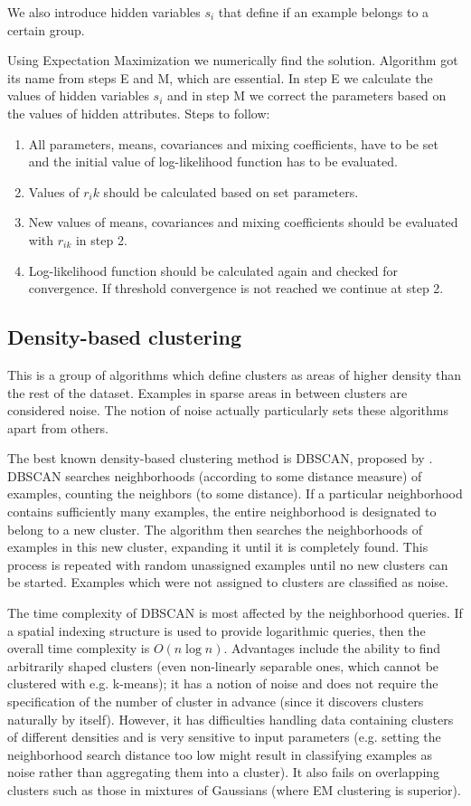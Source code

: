\documentclass[conference]{IEEEtran}
\begin{document}
We also introduce hidden variables $s_i$ that define if an example belongs to a certain group.

Using Expectation Maximization we numerically find the solution. Algorithm got its name from steps E and M,
which are essential. In step E we calculate the values of hidden variables $s_i$ and in step M we correct the parameters based
on the values of hidden attributes. Steps to follow:

\begin{enumerate}
	\item All parameters, means, covariances and mixing coefficients, have to be set and the initial value of log-likelihood
		function has to be evaluated.
	\item Values of $r_ik$ should be calculated based on set parameters.
	\item New values of means, covariances and mixing coefficients should be evaluated with $r_{ik}$ in step 2.
	\item Log-likelihood function should be calculated again and checked for convergence. If threshold convergence
		is not reached we continue at step 2.
\end{enumerate}


\subsection{Density-based clustering}
This is a group of algorithms which define clusters as areas of higher density than the rest
of the dataset. Examples in sparse areas in between clusters are considered noise. The notion
of noise actually particularly sets these algorithms apart from others.

The best known density-based clustering method is DBSCAN, proposed by \cite{ester96}.
DBSCAN searches neighborhoods (according to some distance measure) of examples,
counting the neighbors (to some distance). If a
particular neighborhood contains sufficiently many examples, the entire neighborhood is
designated to belong to a new cluster. The algorithm then searches the neighborhoods of examples
in this new cluster, expanding it until it is completely found.
This process is repeated with random unassigned examples until no new clusters can be started.
Examples which were not assigned to clusters are classified as noise.

The time complexity of DBSCAN is most affected by the neighborhood queries. If a spatial
indexing structure is used to provide logarithmic queries, then the overall time complexity
is $O(n\log n)$. Advantages include the ability to find arbitrarily shaped clusters (even
non-linearly separable ones, which cannot be clustered with e.g. k-means); it has a notion of
noise and does not require the specification of the number of cluster in advance (since it
discovers clusters naturally by itself). However, it has difficulties handling data containing
clusters of different densities and is very sensitive to input parameters (e.g. setting
the neighborhood search distance too low might result in classifying examples as noise
rather than aggregating them into a cluster). It also fails on overlapping clusters such as
those in mixtures of Gaussians (where EM clustering is superior).
\end{document}
